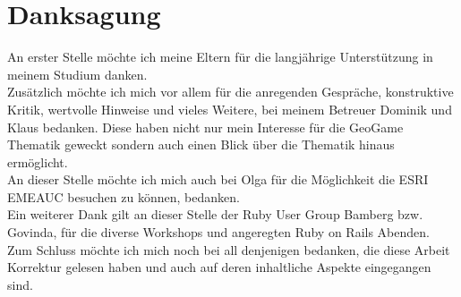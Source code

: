 \chapter*{Danksagung}
\label{ch0:Dank}

An erster Stelle möchte ich meine Eltern für die langjährige Unterstützung in meinem Studium danken.\\
Zusätzlich möchte ich mich vor allem für die anregenden Gespräche, konstruktive Kritik, wertvolle Hinweise und vieles Weitere, bei meinem Betreuer Dominik und Klaus bedanken.
Diese haben nicht nur mein Interesse für die GeoGame Thematik geweckt sondern auch einen Blick über die Thematik hinaus ermöglicht.\\
An dieser Stelle möchte ich mich auch bei Olga für die Möglichkeit die ESRI EMEAUC besuchen zu können, bedanken.\\
Ein weiterer Dank gilt an dieser Stelle der Ruby User Group Bamberg bzw. Govinda, für die diverse Workshops und angeregten Ruby on Rails Abenden.
Zum Schluss möchte ich mich noch bei all denjenigen bedanken, die diese Arbeit Korrektur gelesen haben und auch auf deren inhaltliche Aspekte eingegangen sind.\\

